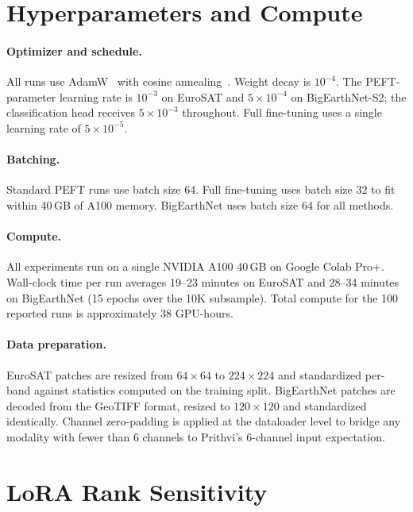 \section{Hyperparameters and Compute}
\label{app:hparams}

\paragraph{Optimizer and schedule.}
All runs use AdamW~\cite{loshchilov2019adamw} with cosine annealing~\cite{loshchilov2017sgdr}. Weight decay is $10^{-4}$. The PEFT-parameter learning rate is $10^{-3}$ on EuroSAT and $5\times 10^{-4}$ on BigEarthNet-S2; the classification head receives $5\times 10^{-3}$ throughout. Full fine-tuning uses a single learning rate of $5\times 10^{-5}$.

\paragraph{Batching.}
Standard PEFT runs use batch size 64. Full fine-tuning uses batch size 32 to fit within 40\,GB of A100 memory. BigEarthNet uses batch size 64 for all methods.

\paragraph{Compute.}
All experiments run on a single NVIDIA A100 40\,GB on Google Colab Pro+. Wall-clock time per run averages 19--23 minutes on EuroSAT and 28--34 minutes on BigEarthNet (15 epochs over the 10K subsample). Total compute for the 100 reported runs is approximately 38 GPU-hours.

\paragraph{Data preparation.}
EuroSAT patches are resized from $64\times 64$ to $224\times 224$ and standardized per-band against statistics computed on the training split. BigEarthNet patches are decoded from the GeoTIFF format, resized to $120\times 120$ and standardized identically. Channel zero-padding is applied at the dataloader level to bridge any modality with fewer than 6 channels to Prithvi's 6-channel input expectation.

\section{LoRA Rank Sensitivity}
\label{app:lora-rank}

